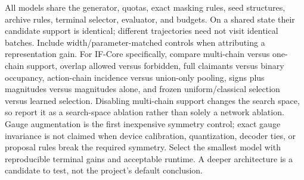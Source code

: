All models share the generator, quotas, exact masking rules, seed structures, archive rules, terminal selector, evaluator, and budgets. On a shared state their candidate support is identical; different trajectories need not visit identical batches. Include width/parameter-matched controls when attributing a representation gain. For IF-Core specifically, compare multi-chain versus one-chain support, overlap allowed versus forbidden, full claimants versus binary occupancy, action-chain incidence versus union-only pooling, signs plus magnitudes versus magnitudes alone, and frozen uniform/classical selection versus learned selection. Disabling multi-chain support changes the search space, so report it as a search-space ablation rather than solely a network ablation. Gauge augmentation is the first inexpensive symmetry control; exact gauge invariance is not claimed when device calibration, quantization, decoder ties, or proposal rules break the required symmetry. Select the smallest model with reproducible terminal gains and acceptable runtime. A deeper architecture is a candidate to test, not the project's default conclusion.
